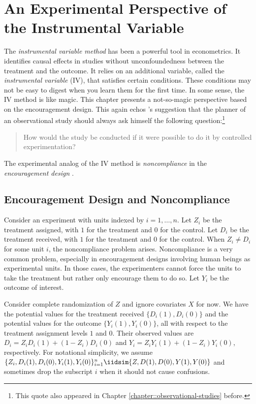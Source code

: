  
\chapter{An Experimental Perspective of the Instrumental Variable}
 \label{chapter::iv-experiment}



The {\it instrumental variable method} has been a powerful tool in econometrics. It identifies causal effects in studies without unconfoundedness between the treatment and the outcome. It relies on an additional variable, called the {\it instrumental variable} (IV), that satisfies certain conditions. These conditions may not be easy to digest when you learn them for the first time. In some sense, the IV method is like magic. This chapter presents a not-so-magic perspective based on the encouragement design. This again echos \citet{dorn1953philosophy}'s suggestion that the planner of an observational study should always ask himself the following question:\footnote{This quote also appeared in Chapter \ref{chapter::observational-studies} before.}
\begin{quote}
How would the study be conducted if it were possible to do
it by controlled experimentation?
\end{quote} 
The experimental analog of the IV method is {\it noncompliance} in the {\it encouragement design} \citep{zelen1979new, powers1984effects, holland1986statistics}. 



\section{Encouragement Design and Noncompliance}

Consider an experiment with units indexed by $i = 1,\ldots, n$. Let $Z_i$ be the treatment assigned, with $1$ for the treatment and $0$ for the control. Let $D_i$ be the treatment received, with $1$ for the treatment and $0$ for the control.  When $Z_i \neq D_i$ for some unit $i$, the noncompliance problem arises.  Noncompliance is a very common problem, especially in encouragement designs involving human beings as experimental units. In those cases, the experimenters cannot force the units to take the treatment but rather only encourage them to do so. 
Let $Y_i$ be the outcome of interest. 

Consider complete randomization of $Z$ and ignore covariates $X$ for now. We have the potential values for the treatment received $\{  D_i(1), D_i(0) \}$ and  the potential values for the outcome $\{ Y_i(1), Y_i(0)  \}$, all with respect to the treatment assignment levels $1$ and $0$. 
Their observed values are $D_i = Z_i D_i(1) + (1-Z_i) D_i(0)$ and $Y_i = Z_i Y_i(1) + (1-Z_i) Y_i(0)$, respectively. 
For notational simplicity, we assume   $\{  Z_i, D_i(1), D_i(0) ,Y_i(1), Y_i(0)  \}_{i=1}^n \iidsim \{  Z, D(1), D(0) ,Y(1), Y(0)  \}$ and sometimes drop the subscript $i$ when it should not cause confusions. 


